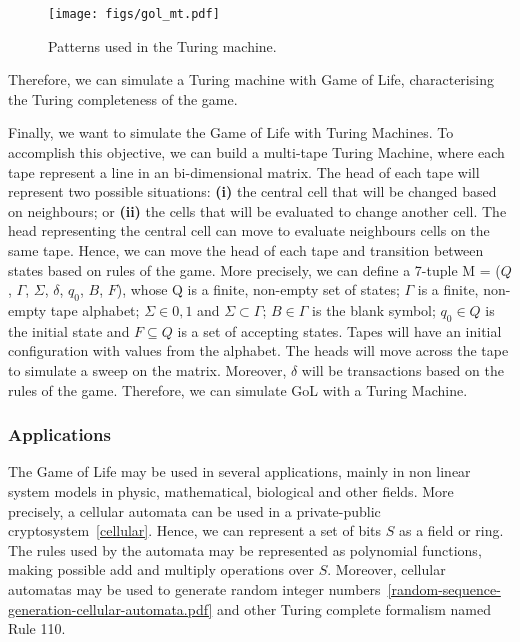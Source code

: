 \documentclass[12pt]{article}
\begin{document}

\begin{figure}[h]
    \centering
    \texttt{[image: figs/gol\_mt.pdf]}
    \caption{Patterns used in the Turing machine.}
    \label{fig:gol_mt}
\end{figure}

Therefore, we can simulate a Turing machine with Game of Life, characterising the Turing completeness of the game.

Finally, we want to simulate the Game of Life with Turing Machines. To accomplish this objective, we can build a multi-tape Turing Machine, where each tape represent a line in an bi-dimensional matrix. The head of each tape will represent two possible situations: \textbf{(i)} the central cell that will be changed based on neighbours; or \textbf{(ii)} the cells that will be evaluated to change another cell. The head representing the central cell can move to evaluate neighbours cells on the same tape. Hence, we can move the head of each tape and transition between states based on rules of the game. More precisely, we can define a 7-tuple M = ($Q$, $\Gamma$, $\Sigma$, $\delta$, $q_0$, $B$, $F$), whose Q is a finite, non-empty set of states; $\Gamma$ is a finite, non-empty tape alphabet; $\Sigma \in {0,1}$ and $\Sigma \subset \Gamma$; $B \in \Gamma$ is the blank symbol; $q_0 \in Q$ is the initial state and $F \subseteq Q$ is a set of accepting states. Tapes will have an initial configuration with values from the alphabet. The heads will move across the tape to simulate a sweep on the matrix. Moreover, $\delta$ will be transactions based on the rules of the game. Therefore, we can simulate GoL with a Turing Machine.


\subsubsection{Applications}

The Game of Life may be used in several applications, mainly in non linear system models in physic, mathematical, biological and other fields. More precisely, a cellular automata can be used in a private-public cryptosystem~\ref{cellular}. Hence, we can represent a set of bits $S$ as a field or ring. The rules used by the automata may be represented as polynomial functions, making possible add and multiply operations over $S$. Moreover, cellular automatas may be used to generate random integer numbers~\ref{random-sequence-generation-cellular-automata.pdf} and other Turing complete formalism named Rule 110.
\end{document}
